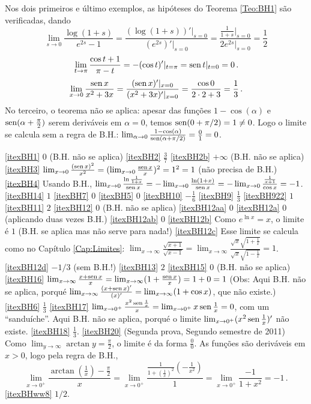 \begin{Solution}{6.49}
Nos dois primeiros e último exemplos, as hipóteses do Teorema \ref{Teo:BH1} são
verificadas, dando
 $$\lim_{s\to 0}\frac{\log(1+s)}{e^{2s}-1}=
\frac{(\log(1+s))'|_{s=0}}{(e^{2s})'|_{s=0}}
=\frac{\frac{1}{1+s}|_{s=0}}{2e^{2s}|_{s=0}}=\frac{1}{2}$$
$$
\lim_{t\to \pi}\frac{\cos t+1}{\pi-t}=-(\cos t)'|_{t=\pi}=\operatorname{sen} t|_{t=0}=0\,.$$
$$
\lim_{x\to 0}\frac{\operatorname{sen} x}{x^2+3x}=\frac{(\operatorname{sen}
x)'|_{x=0}}{(x^2+3x)'|_{x=0}}
=\frac{\cos 0}{2\cdot 2+3}=\frac{1}{3}\,.
$$
No terceiro, o teorema não se aplica: apesar das funções $1-\cos(\alpha)$ e
$\operatorname{sen}(\alpha+\frac{\pi}{2})$ serem deriváveis em $\alpha=0$, temos
$\operatorname{sen} (0+\pi/2)=1\neq 0$. Logo o limite se calcula sem a regra de B.H.:
$\lim_{\alpha\to 0}\frac{1-\cos(\alpha)}{\operatorname{sen} (\alpha+\pi/2)}=\tfrac01=0$.
\end{Solution}
\begin{Solution}{6.50}
\eqref{itexBH1} $0$ (B.H. não se aplica)
\eqref{itexBH2} $\tfrac37$
\eqref{itexBH2b} $+\infty$ (B.H. não se aplica)
\eqref{itexBH3} $\lim_{x\to 0}\frac{(\operatorname{sen} x)^2}{x^2}=(\lim_{x\to 0}\frac{\operatorname{sen}
x}{x})^2=1^2=1$ (não precisa de B.H.)
\eqref{itexBH4} Usando B.H.,  $\lim_{x\to 0}\frac{\ln\frac{1}{1+x}}{\operatorname{sen} x}
=-\lim_{x\to 0}\frac{\ln(1+x)}{\operatorname{sen} x}=-\lim_{x\to 0}\frac{\frac{1}{x+1}}{\cos
x}=-1$.
\eqref{itexBH14} $1$
\eqref{itexBH7} $0$
\eqref{itexBH5} $0$
\eqref{itexBH10} $-\frac{1}{6}$
\eqref{itexBH9} $\tfrac13$
\eqref{itexBH922} $1$
\eqref{itexBH11} $2$
\eqref{itexBH12} $0$ (B.H. não se aplica)
\eqref{itexBH12aa} $0$
\eqref{itexBH12a} $0$ (aplicando duas vezes B.H.)
\eqref{itexBH12ab} $0$
\eqref{itexBH12b} Como $e^{\ln x}=x$, o limite é $1$ (B.H. se aplica mas não
serve para nada!)
\eqref{itexBH12c} Esse limite se calcula como no Capítulo \ref{Cap:Limites}:
$\lim_{x\to \infty}\frac{\sqrt{x+1}}{\sqrt{x-1}}=
\lim_{x\to \infty}\frac{\sqrt{x}\sqrt{1+\frac1x}}{\sqrt{x}\sqrt{1-\frac1x}}=
1$.
\eqref{itexBH12d} $-1/3$ (sem B.H.!)
\eqref{itexBH13} $2$
\eqref{itexBH15} $0$ (B.H. não se aplica)
\eqref{itexBH16} $\lim_{x\to \infty}\frac{x+\operatorname{sen} x}{x}=\lim_{x\to
\infty}(1+\frac{\operatorname{sen} x}{x})=1+0=1$ (Obs: Aqui B.H. não se aplica, porqué
$\lim_{x\to \infty}\frac{(x+\operatorname{sen} x)'}{(x)'}=\lim_{x\to
\infty}(1+\cos x)$, que  não existe.)
\eqref{itexBH6} $\tfrac13$
\eqref{itexBH17} $\lim_{x\to 0^+}\frac{x^2 \operatorname{sen} \frac{1}{x}}{x}=
\lim_{x\to 0^+} x\operatorname{sen} \frac{1}{x}=0$, com um ``sanduíche''. Aqui B.H. não se
aplica, porqué o limite $\lim_{x\to 0^+}(x^2 \operatorname{sen} \frac{1}{x})'$ não existe.
\eqref{itexBH18} $\frac13$. \eqref{itexBH20} (Segunda prova, Segundo semestre de
2011) Como $\lim_{y \to
\infty}\arctan y=\frac{\pi}{2}$, o limite
é da forma $\frac00$. As funções são deriváveis em $x>0$, logo pela
regra de B.H.,
$$
\lim_{x\to 0^+}\frac{\arctan(\frac1x)-\tfrac{\pi}{2}}{x}=
\lim_{x\to 0^+}\frac{\frac{1}{1+(\frac{1}{x})^2}(-\frac{1}{x^2})}{1}=
\lim_{x\to 0^+}\frac{-1}{1+x^2}=-1\,.
$$
\eqref{itexBHww8} $1/2$.
\end{Solution}
